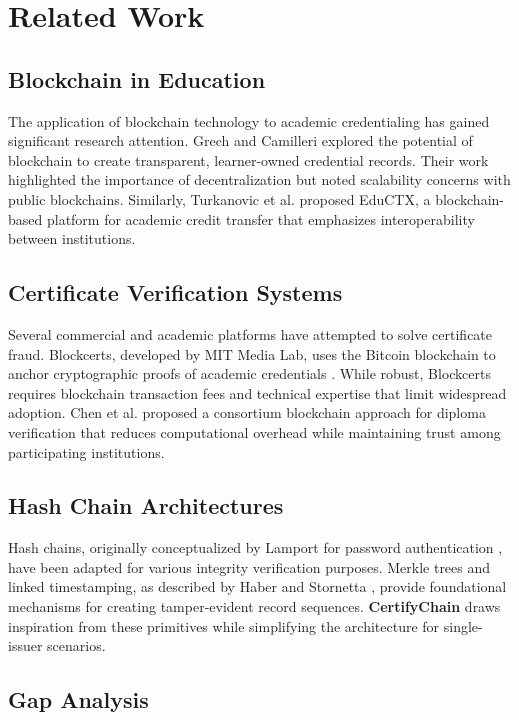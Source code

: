 \documentclass[10pt,twocolumn,a4paper]{article}
\newcommand{\certifychain}{\textbf{CertifyChain}}
\begin{document}
\section{Related Work}

\subsection{Blockchain in Education}

The application of blockchain technology to academic credentialing has gained significant research attention. Grech and Camilleri \cite{grech2017} explored the potential of blockchain to create transparent, learner-owned credential records. Their work highlighted the importance of decentralization but noted scalability concerns with public blockchains. Similarly, Turkanovic et al. \cite{turkanovic2018} proposed EduCTX, a blockchain-based platform for academic credit transfer that emphasizes interoperability between institutions.

\subsection{Certificate Verification Systems}

Several commercial and academic platforms have attempted to solve certificate fraud. Blockcerts, developed by MIT Media Lab, uses the Bitcoin blockchain to anchor cryptographic proofs of academic credentials \cite{malamed2016}. While robust, Blockcerts requires blockchain transaction fees and technical expertise that limit widespread adoption. Chen et al. \cite{chen2018} proposed a consortium blockchain approach for diploma verification that reduces computational overhead while maintaining trust among participating institutions.

\subsection{Hash Chain Architectures}

Hash chains, originally conceptualized by Lamport for password authentication \cite{lamport1981}, have been adapted for various integrity verification purposes. Merkle trees and linked timestamping, as described by Haber and Stornetta \cite{haber1991}, provide foundational mechanisms for creating tamper-evident record sequences. \certifychain{} draws inspiration from these primitives while simplifying the architecture for single-issuer scenarios.

\subsection{Gap Analysis}
\end{document}
